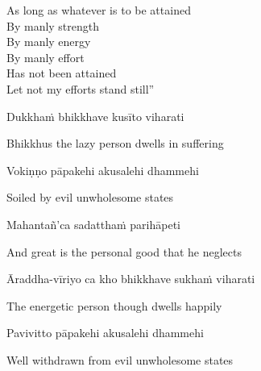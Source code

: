 \begin{english-verses}
  As long as whatever is to be attained\\
  By manly strength\\
  By manly energy\\
  By manly effort\makeatletter\hyperlink{endnote87-appendix}\makeatother\\
  Has not been attained\\
  Let not my efforts stand still''
\end{english-verses}

Dukkhaṁ bhikkhave kusīto viharati

\begin{english}
  Bhikkhus the lazy person dwells in suffering
\end{english}

Vokiṇṇo pāpakehi akusalehi dhammehi

\begin{english}
  Soiled by evil unwholesome states
\end{english}

Mahantañ'ca sadatthaṁ parihāpeti

\begin{english}
  And great is the personal good that he neglects
\end{english}

Āraddha-vīriyo ca kho bhikkhave sukhaṁ viharati

\begin{english}
  The energetic person though dwells happily
\end{english}

Pavivitto pāpakehi akusalehi dhammehi

\begin{english}
  Well withdrawn from evil\makeatletter\hyperlink{endnote88-appendix}\makeatother
  unwholesome states
\end{english}

